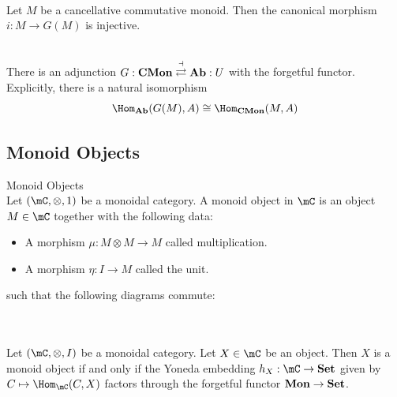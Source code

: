 \documentclass[a4paper]{article}
\begin{document}
\begin{lmm}{}{}\\
Let $M$ be a cancellative commutative monoid. Then the canonical morphism $i:M\to G(M)$ is injective. 
\end{lmm}

\begin{prp}{}{}\\
There is an adjunction $G:\bold{CMon}\overset{\dashv}{\rightleftarrows}\bold{Ab}:U$ with the forgetful functor. Explicitly, there is a natural isomorphism $$\Hom_\bold{Ab}(G(M),A)\cong\Hom_\bold{CMon}(M,A)$$
\end{prp}

\subsection{Monoid Objects}
\begin{defn}{Monoid Objects}{}\\
Let $(\mC,\otimes,1)$ be a monoidal category. A monoid object in $\mC$ is an object $M\in\mC$ together with the following data: 
\begin{itemize}
\item A morphism $\mu:M\otimes M\to M$ called multiplication. 
\item A morphism $\eta:I\to M$ called the unit. 
\end{itemize}
such that the following diagrams commute: \\
\\
\end{defn}

\begin{prp}{}{}\\
Let $(\mC,\otimes,I)$ be a monoidal category. Let $X\in\mC$ be an object. Then $X$ is a monoid object if and only if the Yoneda embedding $h_X:\mC\to\bold{Set}$ given by $C\mapsto\Hom_\mC(C,X)$ factors through the forgetful functor $\bold{Mon}\to\bold{Set}$. 
\end{prp}
\end{document}
